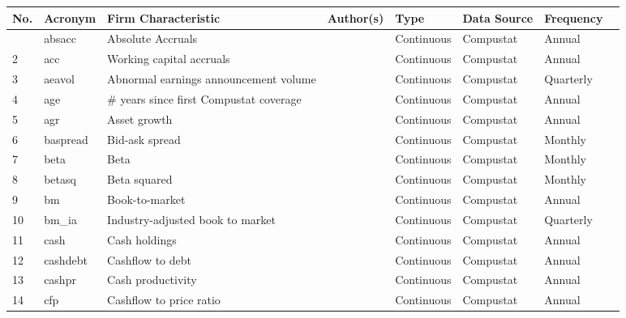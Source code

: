 \documentclass[a4paper, table]{article}
\begin{document}
\begin{landscape}
\begin{table}
	\caption{Stock Level Characteristics, data collected are in \citep{green_supraview_2013}}
	\begin{center}
		\begin{longtable}{llllllll} \hline 
			No. & Acronym & Firm Characteristic & Author(s) & Type & Data Source & Frequency \\ \hline
			\endfirsthead
			\hline 
			\endhead
			\hline
			\endlastfoot
			1 & absacc & Absolute Accruals & 
				\cite{bandyopadhyay_accrual_2010} & Continuous & Compustat & Annual \\
			2 & acc & Working capital accruals & 
				\cite{sloan_stock_1996} & Continuous & Compustat & Annual \\
			3 & aeavol & Abnormal earnings announcement volume & 
				\cite{lerman_high-volume_2008} & Continuous & Compustat & Quarterly \\
			4 & age & \# years since first Compustat coverage & 
				\cite{jiang_information_2005} & Continuous & Compustat & Annual \\
			5 & agr & Asset growth & 
				\cite{cooper_asset_2008} & Continuous & Compustat & Annual \\
			6 & baspread & Bid-ask spread & 
				\cite{amihud_effects_1989} & Continuous & Compustat & Monthly \\
			7 & beta & Beta & 
				\cite{fama_risk_1973} & Continuous & Compustat & Monthly \\
			8 & betasq & Beta squared & 
				\cite{fama_risk_1973} & Continuous & Compustat & Monthly \\
			9 & bm & Book-to-market & 
				\cite{rosenberg_persuasive_1985} & Continuous & Compustat & Annual \\
			10 & bm\_ia & Industry-adjusted book to market & 
				\cite{asness_predicting_2000} & Continuous & Compustat & Quarterly \\
			11 & cash & Cash holdings & 
				\cite{palazzo_cash_2012} & Continuous & Compustat & Annual \\
			12 & cashdebt & Cashflow to debt & 
				\cite{ou_financial_1989} & Continuous & Compustat & Annual \\
			13 & cashpr & Cash productivity & 
				\cite{chandrashekar_productivity_2009} & Continuous & Compustat & Annual \\
			14 & cfp & Cashflow to price ratio & 
				\cite{desai_value-glamour_2004} & Continuous & Compustat & Annual \\

\end{longtable}
\end{center}
\end{table}
\end{landscape}
\end{document}
